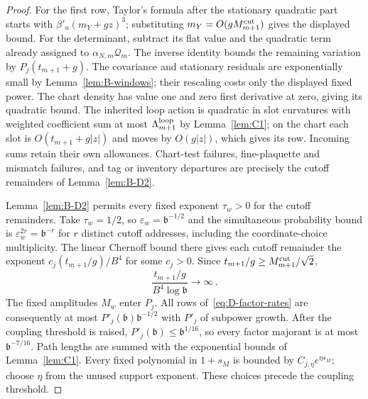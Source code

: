 \begin{proof}
For the first row, Taylor's formula after the stationary quadratic part starts with $\beta'_u(m_Y+gz)^3$; substituting $m_Y=O(gM^{\mathrm{cut}}_{m+1})$ gives the displayed bound. For the determinant, subtract its flat value and the quadratic term already assigned to $\alpha_{N,m}\mathcal Q_m$. The inverse identity bounds the remaining variation by $P_j(t_{m+1}+g)$. The covariance and stationary residuals are exponentially small by Lemma~\ref{lem:B-windows}; their rescaling costs only the displayed fixed power. The chart density has value one and zero first derivative at zero, giving its quadratic bound. The inherited loop action is quadratic in slot curvatures with weighted coefficient sum at most $\Lambda_{m+1}^{\rm loop}$ by Lemma~\ref{lem:C1}; on the chart each slot is $O(t_{m+1}+g|z|)$ and moves by $O(g|z|)$, which gives its row. Incoming sums retain their own allowances. Chart-test failures, fine-plaquette and mismatch failures, and tag or inventory departures are precisely the cutoff remainders of Lemma~\ref{lem:B-D2}.

Lemma~\ref{lem:B-D2} permits every fixed exponent $\tau_w>0$ for the cutoff remainders. Take $\tau_w=1/2$, so $\varepsilon_w=\mathfrak b^{-1/2}$ and the simultaneous probability bound is $\varepsilon_w^{2r}=\mathfrak b^{-r}$ for $r$ distinct cutoff addresses, including the coordinate-choice multiplicity. The linear Chernoff bound there gives each cutoff remainder the exponent $c_j(t_{m+1}/g)/B^4$ for some $c_j>0$. Since $t_{m+1}/g\ge M^{\mathrm{cut}}_{m+1}/\sqrt2$,
\begin{equation*}
\frac{t_{m+1}/g}{B^4\log\mathfrak b}\longrightarrow\infty\,.
\end{equation*}
The fixed amplitudes $M_w$ enter $P_j$. All rows of~\eqref{eq:D-factor-rates} are consequently at most $P'_j(\mathfrak b)\mathfrak b^{-1/2}$ with $P'_j$ of subpower growth. After the coupling threshold is raised, $P'_j(\mathfrak b)\le\mathfrak b^{1/16}$, so every factor majorant is at most $\mathfrak b^{-7/16}$. Path lengths are summed with the exponential bounds of Lemma~\ref{lem:C1}. Every fixed polynomial in $1+s_M$ is bounded by $C_{j,\eta}e^{\eta s_M}$; choose $\eta$ from the unused support exponent. These choices precede the coupling threshold.


\end{proof}
